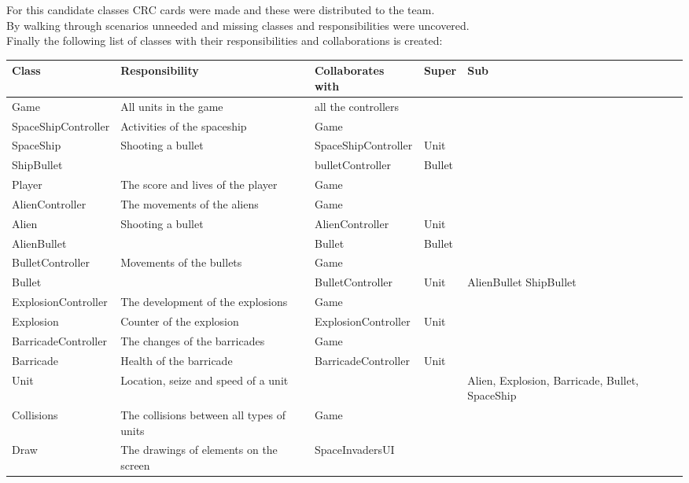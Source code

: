 \documentclass[10pt]{article}
\begin{document}
 \pagebreak
For this candidate classes CRC cards were made and these were distributed to the team. \\
By walking through scenarios unneeded and missing classes and responsibilities were uncovered.\\
Finally the following list of classes with their responsibilities and collaborations is created:
\begin{center}
   \hspace*{-0.75in}\begin{tabular}{ | p{3cm} | p{5cm} | p{3cm} | p{2cm} | p{2cm} |}
  \hline
    Class & Responsibility & Collaborates with & Super & Sub \\ \hline
   Game & All units in the game & all the controllers & & \\ \hline
   SpaceShipController & Activities of the spaceship & Game & & \\ \hline
  SpaceShip & Shooting a bullet & SpaceShipController & Unit & \\ \hline
  ShipBullet& & bulletController & Bullet & \\ \hline
   Player & The score and lives of the player & Game & & \\ \hline
  AlienController & The movements of the aliens & Game & &  \\  \hline
   Alien & Shooting a bullet  & AlienController & Unit &  \\  \hline
   AlienBullet & & Bullet & Bullet &  \\  \hline
   BulletController & Movements of the bullets & Game & &  \\  \hline
   Bullet & &  BulletController & Unit & AlienBullet ShipBullet \\  \hline
   ExplosionController & The development of the explosions & Game & &  \\  \hline
  Explosion & Counter of the explosion & ExplosionController & Unit &  \\  \hline
  BarricadeController & The changes of the barricades & Game & &  \\  \hline
  Barricade & Health of the barricade & BarricadeController & Unit &  \\  \hline
  Unit & Location, seize and speed of a unit &  & & Alien, Explosion, Barricade, Bullet, SpaceShip  \\  \hline
  Collisions & The collisions between all types of units  & Game & &  \\  \hline
  Draw  & The drawings of elements on the screen & SpaceInvadersUI & &  \\  \hline

\end{tabular}
\end{center}
\end{document}
